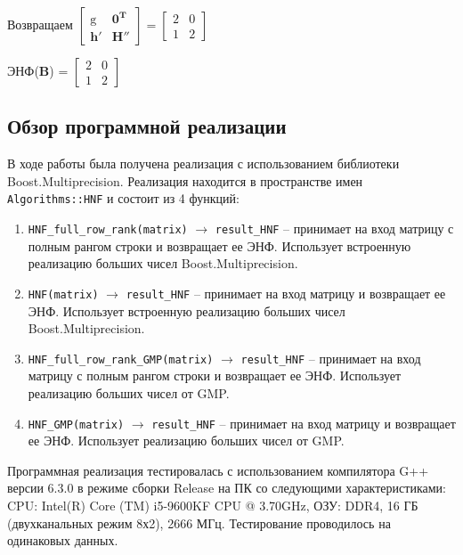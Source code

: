 \begin{enumerate}
Возвращаем $ \left[\begin{array}{cccc}
\mathrm{g} & \mathbf{0}^\mathbf{T} \\
\mathbf{h}' & \mathbf{H}''
\end{array}\right] = \left[\begin{array}{cccc}
2 & 0 \\
1 & 2
\end{array}\right] $
\end{enumerate}

ЭНФ($ \mathbf{B} $) = $ \left[\begin{array}{cccc}
2 & 0 \\
1 & 2
\end{array}\right] $

\subsection{Обзор программной реализации}

В ходе работы была получена реализация с использованием библиотеки Boost.Multiprecision. Реализация находится в пространстве имен \verb!Algorithms::HNF! и состоит из 4 функций:

\begin{enumerate}

\item \verb!HNF_full_row_rank(matrix)! $\rightarrow$ \verb!result_HNF! -- принимает на вход матрицу с полным рангом строки и возвращает ее ЭНФ. Использует встроенную реализацию больших чисел Boost.Multiprecision.

\item \verb!HNF(matrix)! $\rightarrow$ \verb!result_HNF! -- принимает на вход матрицу и возвращает ее ЭНФ. Использует встроенную реализацию больших чисел Boost.Multiprecision.

\item \verb!HNF_full_row_rank_GMP(matrix)! $\rightarrow$ \verb!result_HNF! -- принимает на вход матрицу с полным рангом строки и возвращает ее ЭНФ. Использует реализацию больших чисел от GMP.

\item \verb!HNF_GMP(matrix)! $\rightarrow$ \verb!result_HNF! -- принимает на вход матрицу и возвращает ее ЭНФ. Использует реализацию больших чисел от GMP.

\end{enumerate}

Программная реализация тестировалась с использованием компилятора G++ версии 6.3.0 в режиме сборки Release на ПК со следующими характеристиками: CPU: Intel(R) Core (TM) i5-9600KF CPU @ 3.70GHz, ОЗУ: DDR4, 16 ГБ (двухканальных режим 8х2), 2666 МГц. Тестирование проводилось на одинаковых данных.

